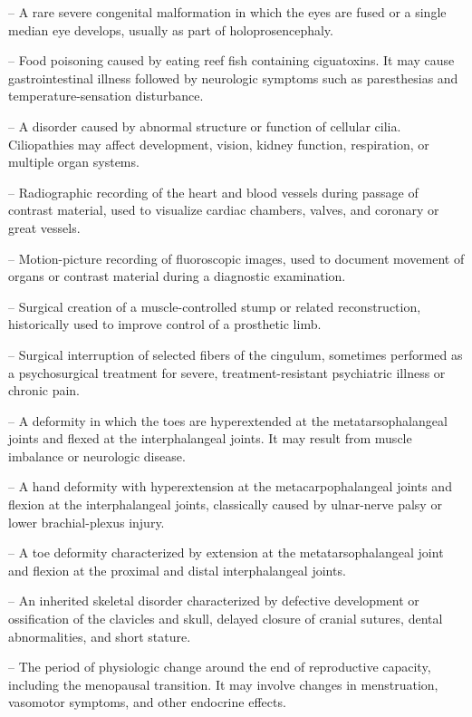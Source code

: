 -- A rare severe congenital malformation in which the eyes are fused or a single median eye develops, usually as part of holoprosencephaly.

-- Food poisoning caused by eating reef fish containing ciguatoxins. It may cause gastrointestinal illness followed by neurologic symptoms such as paresthesias and temperature-sensation disturbance.

-- A disorder caused by abnormal structure or function of cellular cilia. Ciliopathies may affect development, vision, kidney function, respiration, or multiple organ systems.

-- Radiographic recording of the heart and blood vessels during passage of contrast material, used to visualize cardiac chambers, valves, and coronary or great vessels.

-- Motion-picture recording of fluoroscopic images, used to document movement of organs or contrast material during a diagnostic examination.

-- Surgical creation of a muscle-controlled stump or related reconstruction, historically used to improve control of a prosthetic limb.

-- Surgical interruption of selected fibers of the cingulum, sometimes performed as a psychosurgical treatment for severe, treatment-resistant psychiatric illness or chronic pain.

-- A deformity in which the toes are hyperextended at the metatarsophalangeal joints and flexed at the interphalangeal joints. It may result from muscle imbalance or neurologic disease.

-- A hand deformity with hyperextension at the metacarpophalangeal joints and flexion at the interphalangeal joints, classically caused by ulnar-nerve palsy or lower brachial-plexus injury.

-- A toe deformity characterized by extension at the metatarsophalangeal joint and flexion at the proximal and distal interphalangeal joints.


-- An inherited skeletal disorder characterized by defective development or ossification of the clavicles and skull, delayed closure of cranial sutures, dental abnormalities, and short stature.

-- The period of physiologic change around the end of reproductive capacity, including the menopausal transition. It may involve changes in menstruation, vasomotor symptoms, and other endocrine effects.

